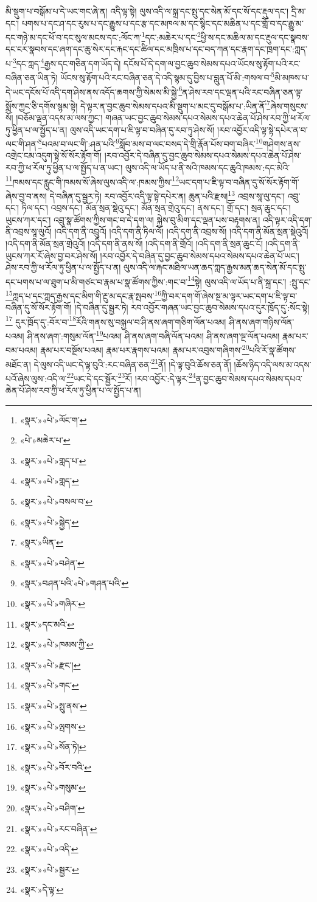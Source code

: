 མི་སྡུག་པ་བསྒོམ་པ་དེ་ཡང་གང་ཞེ་ན། འདི་ལྟ་སྟེ། ལུས་འདི་ལ་སྐྲ་དང་སྤུ་དང་སེན་མོ་དང་སོ་དང་རྡུལ་དང་། དྲི་མ་དང་། པགས་པ་དང་ཤ་དང་རུས་པ་དང་རྒྱུས་པ་དང་རྩ་དང་མཁལ་མ་དང་སྙིང་དང་མཆིན་པ་དང་གློ་བ་དང་རྒྱུ་མ་དང་གཉེ་མ་དང་ཕོ་བ་དང་སུལ་མངས་དང་:ལོང་ཀ་\footnote{«སྣར་»«པེ་»ལོང་ག་}དང་:མཆེར་པ་དང་\footnote{«པེ་»མཆེར་པ་}ཕྱི་ས་དང་མཆིལ་མ་དང་རྔུལ་དང་སྣབས་དང་ངར་སྣབས་དང་ཞག་དང་ཆུ་སེར་དང་རྐང་དང་ཚིལ་དང་མཁྲིས་པ་དང་བད་ཀན་དང་རྣག་དང་ཁྲག་དང་:ཀླད་པ་\footnote{«སྣར་»«པེ་»གླད་པ་}དང་ཀླད་\footnote{«སྣར་»«པེ་»གླད་}རྒྱས་དང་གཅིན་དག་ཡོད་དེ། དངོས་པོ་དེ་དག་ལ་བྱང་ཆུབ་སེམས་དཔའ་ཡོངས་སུ་རྟོག་པའི་རང་བཞིན་ཅན་ཡིན་ཏེ། ཡོངས་སུ་རྟོག་པའི་རང་བཞིན་ཅན་དེ་འདི་སྙམ་དུ་བྱིས་པ་བླུན་པོ་མི་:གསལ་བ་\footnote{«སྣར་»«པེ་»བསལ་བ་}མི་མཁས་པ་དེ་ཡང་དངོས་པོ་འདི་དག་ཤེས་ནས་འདོད་ཆགས་ཀྱི་སེམས་མི་སྐྱེ་\footnote{«སྣར་»«པེ་»སྐྱེད་}ན་ཤེས་རབ་དང་ལྡན་པའི་རང་བཞིན་ཅན་ལྟ་སྨོས་ཀྱང་ཅི་དགོས་སྙམ་སྟེ། དེ་ལྟར་ན་བྱང་ཆུབ་སེམས་དཔའ་མི་སྡུག་པ་མང་དུ་བསྒོམ་པ་:ཡིན་ནོ་\footnote{«སྣར་»ཡིན་}ཞེས་གསུངས་སོ། །བཅོམ་ལྡན་འདས་མ་ལས་ཀྱང་། གཞན་ཡང་བྱང་ཆུབ་སེམས་དཔའ་སེམས་དཔའ་ཆེན་པོ་ཤེས་རབ་ཀྱི་ཕ་རོལ་ཏུ་ཕྱིན་པ་ལ་སྤྱོད་པ་ན། ལུས་འདི་ཡང་དག་པ་ཇི་ལྟ་བ་བཞིན་དུ་རབ་ཏུ་ཤེས་སོ། །རབ་འབྱོར་འདི་ལྟ་སྟེ་དཔེར་ན་བ་ལང་གི་ཤན་\footnote{«སྣར་»«པེ་»བཤེན་}པའམ་བ་ལང་གི་:ཤན་པའི་\footnote{«སྣར་»བཤན་པའི་«པེ་»གཤན་པའི་}སློབ་མས་བ་ལང་བསད་དེ་གྲི་རྣོན་པོས་བག་བཞིར་\footnote{«སྣར་»«པེ་»གཞིར་}གཤེགས་ནས་འགྲེང་ངམ་འདུག་སྟེ་སོ་སོར་རྟོག་གོ། །རབ་འབྱོར་དེ་བཞིན་དུ་བྱང་ཆུབ་སེམས་དཔའ་སེམས་དཔའ་ཆེན་པོ་ཤེས་རབ་ཀྱི་ཕ་རོལ་ཏུ་ཕྱིན་པ་ལ་སྤྱོད་པ་ན་ཡང་། ལུས་འདི་ལ་ཡོད་པ་ནི་སའི་ཁམས་དང་ཆུའི་ཁམས་:དང་མེའི་\footnote{«སྣར་»དང་མའི་}ཁམས་དང་རླུང་གི་ཁམས་སོ་ཞེས་ལུས་འདི་ལ་:ཁམས་ཀྱིས་\footnote{«སྣར་»«པེ་»ཁམས་ཀྱི་}ཡང་དག་པ་ཇི་ལྟ་བ་བཞིན་དུ་སོ་སོར་རྟོག་གོ་ཞེས་བྱ་བ་ནས། དེ་བཞིན་དུ་སྦྱར་ཏེ། རབ་འབྱོར་འདི་ལྟ་སྟེ་དཔེར་ན། ཆུན་པའི་རྫས།\footnote{«སྣར་»«པེ་»རྫང་།} འབྲས་སཱ་ལུ་དང་། འབྲུ་དང་། ཏིལ་དང་། འབྲས་དང་། མོན་སྲན་སྡེའུ་དང་། མོན་སྲན་གྲེའུ་དང་། ནས་དང་། གྲོ་དང་། སྲན་ཆུང་དང་། ཡུངས་ཀར་དང་། འབྲུ་སྣ་ཚོགས་ཀྱིས་གང་བ་དེ་དག་ལ། སྐྱེས་བུ་མིག་དང་ལྡན་པས་བརྟགས་ན། འདི་ལྟར་འདི་དག་ནི་འབྲས་སཱ་ལུའོ། །འདི་དག་ནི་འབྲུའོ། །འདི་དག་ནི་ཏིལ་ལོ། །འདི་དག་ནི་འབྲས་སོ། །འདི་དག་ནི་མོན་སྲན་སྡེའུའོ། །འདི་དག་ནི་མོན་སྲན་གྲེའུའོ། །འདི་དག་ནི་ནས་སོ། །འདི་དག་ནི་གྲོའོ། །འདི་དག་ནི་སྲན་ཆུང་ངོ། །འདི་དག་ནི་ཡུངས་ཀར་རོ་ཞེས་བྱ་བར་ཤེས་སོ། །རབ་འབྱོར་དེ་བཞིན་དུ་བྱང་ཆུབ་སེམས་དཔའ་སེམས་དཔའ་ཆེན་པོ་ཡང་། ཤེས་རབ་ཀྱི་ཕ་རོལ་ཏུ་ཕྱིན་པ་ལ་སྤྱོད་པ་ན། ལུས་འདི་ལ་རྐང་མཐིལ་ཡན་ཆད་ཀླད་རྒྱས་མན་ཆད་སེན་མོ་དང་སྤུ་དང་པགས་པ་ལ་ཐུག་པ་མི་གཙང་བ་རྣམ་པ་སྣ་ཚོགས་ཀྱིས་:གང་བ་\footnote{«སྣར་»«པེ་»གང་}སྟེ། ལུས་འདི་ལ་ཡོད་པ་ནི་སྐྲ་དང་། :སྤུ་དང་\footnote{«སྣར་»«པེ་»སྤུ་ནས་}ཀླད་པ་དང་ཀླད་རྒྱས་དང་མིག་གི་རྔུ་མ་དང་རྣ་སྤབས་\footnote{«སྣར་»«པེ་»ལྤགས་}ཀྱི་བར་དག་གོ་ཞེས་སྔ་མ་ལྟར་ཡང་དག་པ་ཇི་ལྟ་བ་བཞིན་དུ་སོ་སོར་རྟོག་གོ། །དེ་བཞིན་དུ་སྦྱར་ཏེ། རབ་འབྱོར་གཞན་ཡང་བྱང་ཆུབ་སེམས་དཔའ་དུར་ཁྲོད་དུ་:སོང་སྟེ།\footnote{«སྣར་»«པེ་»སོན་ཏེ།} དུར་ཁྲོད་དུ་:བོར་བ་\footnote{«སྣར་»«པེ་»བོར་བའི་}རོའི་གནས་སུ་བསྐྱལ་བ་ཤི་ནས་ཞག་གཅིག་ལོན་པའམ། ཤི་ནས་ཞག་གཉིས་ལོན་པའམ། ཤི་ནས་ཞག་:གསུམ་ལོན་\footnote{«སྣར་»«པེ་»གསུམ་}པའམ། ཤི་ནས་ཞག་བཞི་ལོན་པའམ། ཤི་ནས་ཞག་ལྔ་ལོན་པའམ། རྣམ་པར་བམ་པའམ། རྣམ་པར་བསྔོས་པའམ། རྣམ་པར་རྣགས་པའམ། རྣམ་པར་འབུས་གཞིགས་\footnote{«སྣར་»«པེ་»བཤིག་}པའི་རོ་སྣ་ཚོགས་མཐོང་ན། དེ་ལུས་འདི་ཡང་དེ་ལྟ་བུའི་:རང་བཞིན་ཅན་\footnote{«སྣར་»«པེ་»རང་བཞིན་}ནོ། །དེ་ལྟ་བུའི་ཆོས་ཅན་ནོ། །ཆོས་ཉིད་འདི་ལས་མ་འདས་པའོ་ཞེས་ལུས་:འདི་ལ་\footnote{«སྣར་»«པེ་»འདི་}ཡང་དེ་དང་སྦྱོར་\footnote{«སྣར་»«པེ་»སྦྱར་}རོ། །རབ་འབྱོར་:དེ་ལྟར་\footnote{«སྣར་»དེ་ལྟ་}ན་བྱང་ཆུབ་སེམས་དཔའ་སེམས་དཔའ་ཆེན་པོ་ཤེས་རབ་ཀྱི་ཕ་རོལ་ཏུ་ཕྱིན་པ་ལ་སྤྱོད་པ་ན། 